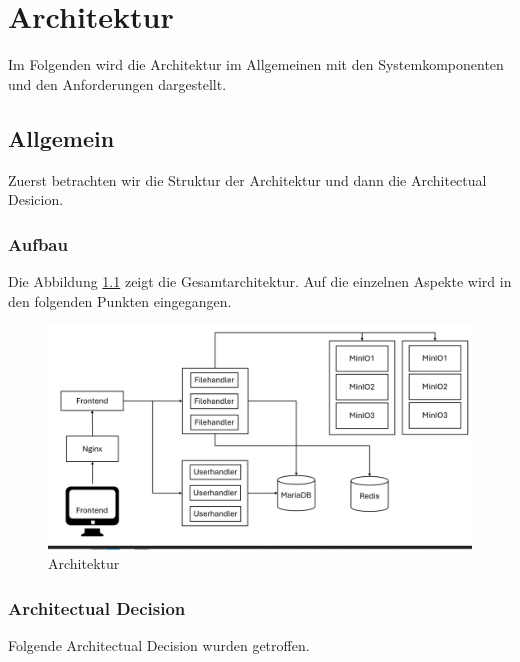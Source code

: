 \documentclass[12pt]{report}
\begin{document}
\begin{acronym}[SOAP]
\end{acronym}


\addtocounter{frontmatterPage}{\value{page}} 

\newpage
{}
\chapter{Architektur}
	Im Folgenden wird die Architektur im Allgemeinen mit den Systemkomponenten und den Anforderungen dargestellt.
	\section{Allgemein}
		Zuerst betrachten wir die Struktur der Architektur und dann die Architectual Desicion.
		\subsection{Aufbau}
			Die Abbildung \ref{fig:architektur} zeigt die Gesamtarchitektur. Auf die einzelnen Aspekte wird in den folgenden Punkten eingegangen.
			\begin{figure}[h]
				\centering
				\includegraphics[width=\linewidth]{architektur}
				\caption{Architektur}
				\label{fig:architektur}
			\end{figure}
			
		\subsection{Architectual Decision}
			Folgende Architectual Decision wurden getroffen.
			
\end{document}
